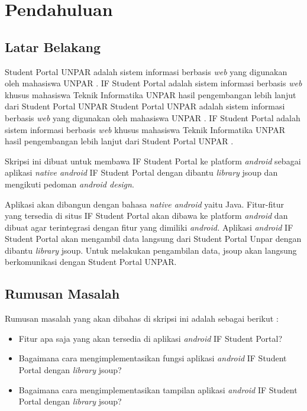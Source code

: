 \chapter{Pendahuluan}
\label{chap:intro}
   
\section{Latar Belakang}
\label{sec:label}

Student Portal UNPAR adalah sistem informasi berbasis \textit{web} yang digunakan oleh mahasiswa UNPAR \cite{studentportalunpar}. IF Student Portal adalah sistem informasi berbasis \textit{web} khusus mahasiswa Teknik Informatika UNPAR hasil pengembangan  lebih lanjut dari Student Portal UNPAR \cite{herfan:15:portal} Student Portal UNPAR adalah sistem informasi berbasis \textit{web} yang digunakan oleh mahasiswa UNPAR \cite{studentportalunpar}. IF Student Portal adalah sistem informasi berbasis \textit{web} khusus mahasiswa Teknik Informatika UNPAR hasil pengembangan  lebih lanjut dari Student Portal UNPAR \cite{herfan:15:portal}. 

Skripsi ini dibuat untuk membawa IF Student Portal ke platform \textit{android} sebagai aplikasi \textit{native android} IF Student Portal dengan dibantu \textit{library} jsoup dan mengikuti pedoman \textit{android design}. 

 Aplikasi akan dibangun dengan bahasa \textit{native android} yaitu Java. Fitur-fitur yang tersedia di situs IF Student Portal akan dibawa ke platform \textit{android} dan dibuat agar terintegrasi dengan fitur yang dimiliki \textit{android.} Aplikasi \textit{android} IF Student Portal akan mengambil data langsung dari Student Portal Unpar dengan dibantu \textit{library} jsoup. Untuk melakukan pengambilan data, jsoup akan langsung berkomunikasi dengan Student Portal UNPAR.  

\section{Rumusan Masalah}
\label{sec:rumusan}
Rumusan masalah yang akan dibahas di skripsi ini adalah sebagai berikut :
\begin{itemize}
    \item Fitur apa saja yang akan tersedia di aplikasi \textit{android} IF Student Portal?
    \item Bagaimana cara mengimplementasikan fungsi aplikasi \textit{android} IF Student Portal dengan \textit{library} jsoup?
    \item Bagaimana cara mengimplementasikan tampilan aplikasi \textit{android} IF Student Portal dengan \textit{library} jsoup?
\end{itemize}

